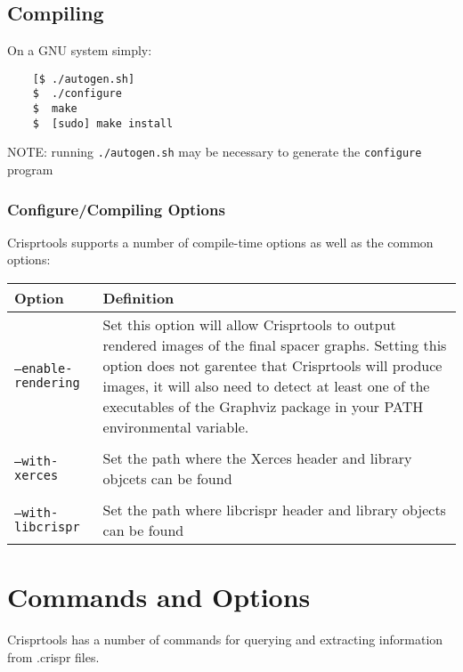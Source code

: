 \documentclass[11pt]{article} %
\newcommand{\programname}{Crisprtools }
\newcommand{\longoptionflag}[1]{\texttt{--#1}}
\begin{document}
\subsection{Compiling}
On a GNU system simply:
\begin{lstlisting}
	[$ ./autogen.sh]
	$  ./configure
	$  make
	$  [sudo] make install
\end{lstlisting}
NOTE: running \lstinline$./autogen.sh$ may be necessary to generate the \lstinline$configure$ program
\subsubsection{Configure/Compiling Options}
\label{sec:configure}
\programname supports a number of compile-time options as well as the common options:

    \begin{longtable}{  l    p{10cm} }
    \hline
    Option & Definition \\  \hline\hline   
\longoptionflag{enable-rendering} &  Set this option will allow \programname to output rendered images of the final spacer graphs.  Setting this option does not garentee that \programname will produce images, it will also need to detect at least one of the executables of the Graphviz package in your PATH environmental variable. \\  \\
\longoptionflag{with-xerces} & Set the path where the Xerces header and library objcets can be found\\ \\
\longoptionflag{with-libcrispr} & Set the path where libcrispr header and library objects can be found \\

    \hline
    \end{longtable}

\section{Commands and Options}
\programname has a number of commands for querying and extracting information from .crispr files.  
\end{document}
